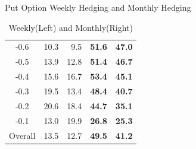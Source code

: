 \documentclass[10pt,table,mathserif]{beamer}
\begin{document}
\begin{frame}[fragile]{Put Option Weekly Hedging and Monthly Hedging}
\begin{table}[htp!]
{\begin{tabular}{|c|r r r r|}
-0.6      &10.3   &9.5  &\textbf{51.6} &\textbf{47.0}  \\
-0.5      &13.9   &12.8 &\textbf{51.4} &\textbf{46.7} \\
-0.4      &15.6   &16.7 &\textbf{53.4} &\textbf{45.1}  \\
-0.3      &19.5   &13.4 &\textbf{48.4} &\textbf{40.7}  \\
-0.2      &20.6   &18.4 &\textbf{44.7} &\textbf{35.1}  \\
-0.1      &13.0   &19.9 &\textbf{26.8} &\textbf{25.3}  \\
Overall   &13.5   &12.7 &\textbf{49.5} &\textbf{41.2}  \\
			\hline
		\end{tabular}
}\caption{Weekly(Left) and Monthly(Right)}
\end{table}
\end{frame}
\end{document}
